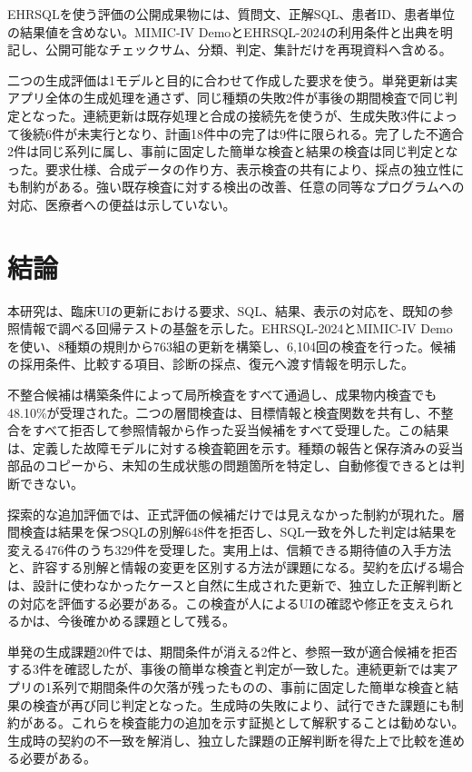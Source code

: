 \documentclass[manuscript,review,anonymous]{acmart}
\begin{document}
EHRSQLを使う評価の公開成果物には、質問文、正解SQL、患者ID、患者単位の結果値を含めない。MIMIC-IV DemoとEHRSQL-2024の利用条件と出典を明記し、公開可能なチェックサム、分類、判定、集計だけを再現資料へ含める。

二つの生成評価は1モデルと目的に合わせて作成した要求を使う。単発更新は実アプリ全体の生成処理を通さず、同じ種類の失敗2件が事後の期間検査で同じ判定となった。連続更新は既存処理と合成の接続先を使うが、生成失敗3件によって後続6件が未実行となり、計画18件中の完了は9件に限られる。完了した不適合2件は同じ系列に属し、事前に固定した簡単な検査と結果の検査は同じ判定となった。要求仕様、合成データの作り方、表示検査の共有により、採点の独立性にも制約がある。強い既存検査に対する検出の改善、任意の同等なプログラムへの対応、医療者への便益は示していない。

\section{結論}

本研究は、臨床UIの更新における要求、SQL、結果、表示の対応を、既知の参照情報で調べる回帰テストの基盤を示した。EHRSQL-2024とMIMIC-IV Demoを使い、8種類の規則から763組の更新を構築し、6,104回の検査を行った。候補の採用条件、比較する項目、診断の採点、復元へ渡す情報を明示した。

不整合候補は構築条件によって局所検査をすべて通過し、成果物内検査でも48.10\%が受理された。二つの層間検査は、目標情報と検査関数を共有し、不整合をすべて拒否して参照情報から作った妥当候補をすべて受理した。この結果は、定義した故障モデルに対する検査範囲を示す。種類の報告と保存済みの妥当部品のコピーから、未知の生成状態の問題箇所を特定し、自動修復できるとは判断できない。

探索的な追加評価では、正式評価の候補だけでは見えなかった制約が現れた。層間検査は結果を保つSQLの別解648件を拒否し、SQL一致を外した判定は結果を変える476件のうち329件を受理した。実用上は、信頼できる期待値の入手方法と、許容する別解と情報の変更を区別する方法が課題になる。契約を広げる場合は、設計に使わなかったケースと自然に生成された更新で、独立した正解判断との対応を評価する必要がある。この検査が人によるUIの確認や修正を支えられるかは、今後確かめる課題として残る。

単発の生成課題20件では、期間条件が消える2件と、参照一致が適合候補を拒否する3件を確認したが、事後の簡単な検査と判定が一致した。連続更新では実アプリの1系列で期間条件の欠落が残ったものの、事前に固定した簡単な検査と結果の検査が再び同じ判定となった。生成時の失敗により、試行できた課題にも制約がある。これらを検査能力の追加を示す証拠として解釈することは勧めない。生成時の契約の不一致を解消し、独立した課題の正解判断を得た上で比較を進める必要がある。



\end{document}
